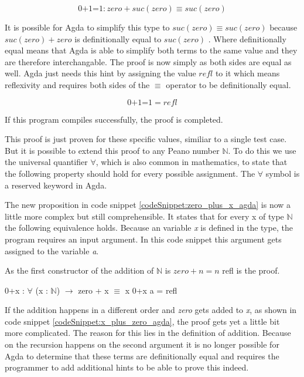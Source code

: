 $$\text{0+1=1} : zero + suc(zero) \equiv suc(zero)$$

It is possible for Agda to simplify this type to $suc(zero) \equiv suc(zero)$ because $suc(zero) + zero$ is definitionally equal to $suc(zero)$ . Where definitionally equal means that Agda is able to simplify both terms to the same value and they are therefore interchangable.
The proof is now simply as both sides are equal as well. Agda just needs this hint by assigning the value $refl$ to it which means reflexivity and requires both sides of the $\equiv$ operator to be definitionally equal.

$$\text{0+1=1} = refl$$

If this program compiles successfully, the proof is completed.

This proof is just proven for these specific values, similiar to a single test case. But it is possible to extend this proof to any Peano number $\mathbb{N}$. 
To do this we use the universal quantifier $\forall$, which is also common in mathematics, to state that the following property should hold for every possible assignment.
The $\forall$ symbol is a reserved keyword in Agda.

The new proposition in code snippet \ref{codeSnippet:zero_plus_x_agda} is now a little more complex but still comprehensible. It states that for every x of type $\mathbb{N}$ the following equivalence holds. 
Because an variable \emph{x} is defined in the type, the program requires an input argument. In this code snippet this argument gets assigned to the variable \emph{a}.

As the first constructor of the addition of $\mathbb{N}$ is $zero + n = n$ refl is the proof.

\begin{codesnippet}[mathescape=true, caption={Proof of addition to zero in Agda}, label={codeSnippet:zero_plus_x_agda}]
0+x : $\forall$ (x : $\mathbb{N}$) $\rightarrow$ zero + x $\equiv$ x
0+x a = refl
\end{codesnippet}

If the addition happens in a different order and \emph{zero} gets added to \emph{x}, as shown in code snippet \ref{codeSnippet:x_plus_zero_agda}, the proof gets yet a little bit more complicated. 
The reason for this lies in the definition of addition.
Because on the recursion happens on the second argument it is no longer possible for Agda to determine that these terms are definitionally equal and requires the programmer to add additional hints to be able to prove this indeed.

